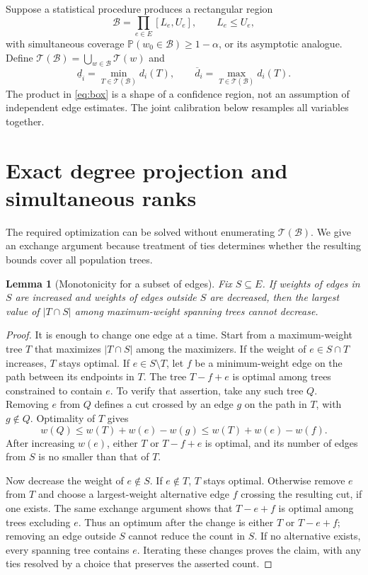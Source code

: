 \documentclass[pdflatex,sn-mathphys-ay]{sn-jnl}
\theoremstyle{thmstyleone}
\newtheorem{lemma}[theorem]{Lemma}
\theoremstyle{thmstyletwo}
\newcommand{\T}{\mathcal T}
\newcommand{\B}{\mathcal B}
\newcommand{\Prob}{\mathbb P}
\begin{document}
Suppose a statistical procedure produces a rectangular region
\begin{equation}\label{eq:box}
 \B=\prod_{e\in E}[L_e,U_e],\qquad L_e\le U_e,
\end{equation}
with simultaneous coverage $\Prob(w_0\in\B)\ge 1-\alpha$, or its asymptotic analogue. Define $\T(\B)=\bigcup_{w\in\B}\T(w)$ and
\begin{equation}\label{eq:degbounds}
 \underline d_i=\min_{T\in\T(\B)}d_i(T),\qquad
 \overline d_i=\max_{T\in\T(\B)}d_i(T).
\end{equation}
The product in \eqref{eq:box} is a shape of a confidence region, not an assumption of independent edge estimates. The joint calibration below resamples all variables together.

\section{Exact degree projection and simultaneous ranks}\label{sec:projection}
The required optimization can be solved without enumerating $\T(\B)$. We give an exchange argument because treatment of ties determines whether the resulting bounds cover all population trees.

\begin{lemma}[Monotonicity for a subset of edges]\label{lem:monotone}
Fix $S\subseteq E$. If weights of edges in $S$ are increased and weights of edges outside $S$ are decreased, then the largest value of $|T\cap S|$ among maximum-weight spanning trees cannot decrease.
\end{lemma}
\begin{proof}
It is enough to change one edge at a time. Start from a maximum-weight tree $T$ that maximizes $|T\cap S|$ among the maximizers. If the weight of $e\in S\cap T$ increases, $T$ stays optimal. If $e\in S\setminus T$, let $f$ be a minimum-weight edge on the path between its endpoints in $T$. The tree $T-f+e$ is optimal among trees constrained to contain $e$. To verify that assertion, take any such tree $Q$. Removing $e$ from $Q$ defines a cut crossed by an edge $g$ on the path in $T$, with $g\notin Q$. Optimality of $T$ gives
\[
 w(Q)\le w(T)+w(e)-w(g)\le w(T)+w(e)-w(f).
\]
After increasing $w(e)$, either $T$ or $T-f+e$ is optimal, and its number of edges from $S$ is no smaller than that of $T$.

Now decrease the weight of $e\notin S$. If $e\notin T$, $T$ stays optimal. Otherwise remove $e$ from $T$ and choose a largest-weight alternative edge $f$ crossing the resulting cut, if one exists. The same exchange argument shows that $T-e+f$ is optimal among trees excluding $e$. Thus an optimum after the change is either $T$ or $T-e+f$; removing an edge outside $S$ cannot reduce the count in $S$. If no alternative exists, every spanning tree contains $e$. Iterating these changes proves the claim, with any ties resolved by a choice that preserves the asserted count.
\end{proof}
\end{document}
